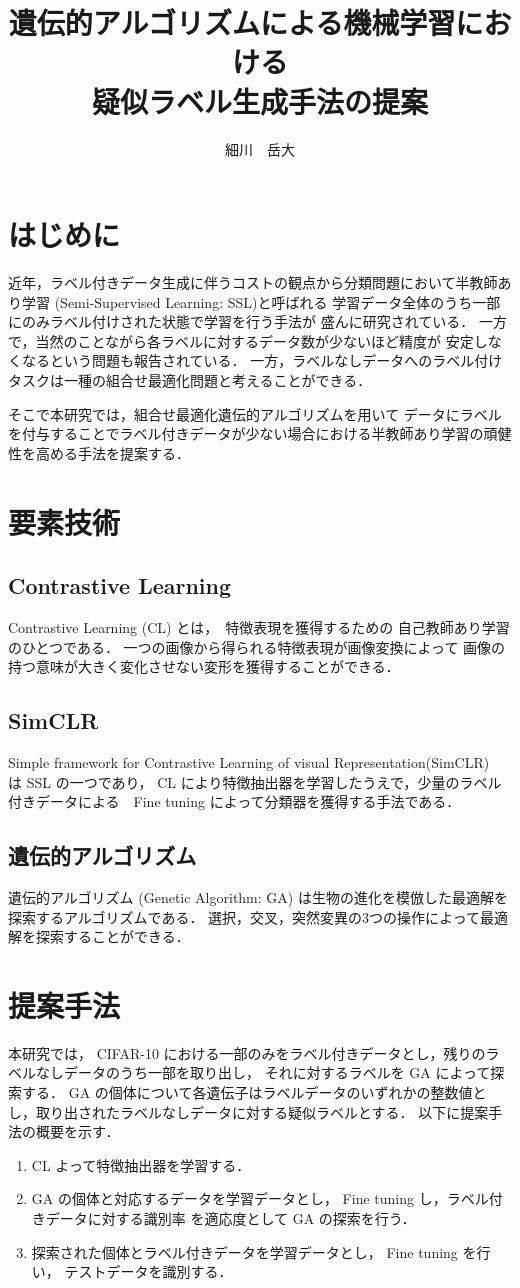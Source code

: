 \documentclass[a4paper,twoside,twocolumn,10pt]{jarticle}     %
\title{遺伝的アルゴリズムによる機械学習における\\疑似ラベル生成手法の提案}
\author{細川　岳大}
\begin{document}
\maketitle
\small
\section{はじめに}
近年，ラベル付きデータ生成に伴うコストの観点から分類問題において半教師あり学習
 (Semi-Supervised Learning: SSL)と呼ばれる
学習データ全体のうち一部にのみラベル付けされた状態で学習を行う手法が
盛んに研究されている．
一方で，当然のことながら各ラベルに対するデータ数が少ないほど精度が
安定しなくなるという問題も報告されている．
一方，ラベルなしデータへのラベル付けタスクは一種の組合せ最適化問題と考えることができる．

そこで本研究では，組合せ最適化遺伝的アルゴリズムを用いて
データにラベルを付与することでラベル付きデータが少ない場合における半教師あり学習の頑健
性を高める手法を提案する．
\section{要素技術}
\subsection{Contrastive Learning}
Contrastive Learning (CL) とは，　特徴表現を獲得するための
自己教師あり学習のひとつである．
一つの画像から得られる特徴表現が画像変換によって
画像の持つ意味が大きく変化させない変形を獲得することができる．
\subsection{SimCLR}
Simple framework for Contrastive Learning of visual Representation(SimCLR)\cite{chen2020simple}　は SSL の一つであり，
 CL により特徴抽出器を学習したうえで，少量のラベル付きデータによる　Fine tuning によって分類器を獲得する手法である．

\subsection{遺伝的アルゴリズム}
遺伝的アルゴリズム (Genetic Algorithm: GA) は生物の進化を模倣した最適解を探索するアルゴリズムである．
選択，交叉，突然変異の3つの操作によって最適解を探索することができる．
\section{提案手法}
本研究では， CIFAR-10 における一部のみをラベル付きデータとし，残りのラベルなしデータのうち一部を取り出し，
それに対するラベルを GA によって探索する．
GA の個体について各遺伝子はラベルデータのいずれかの整数値とし，取り出されたラベルなしデータに対する疑似ラベルとする．
以下に提案手法の概要を示す．
\begin{enumerate}
	\item CL よって特徴抽出器を学習する．
	\item GA の個体と対応するデータを学習データとし， Fine tuning し，ラベル付きデータに対する識別率
	を適応度として GA の探索を行う．
	\item 探索された個体とラベル付きデータを学習データとし， Fine tuning を行い，
	テストデータを識別する．
\end{enumerate}
\end{document}
